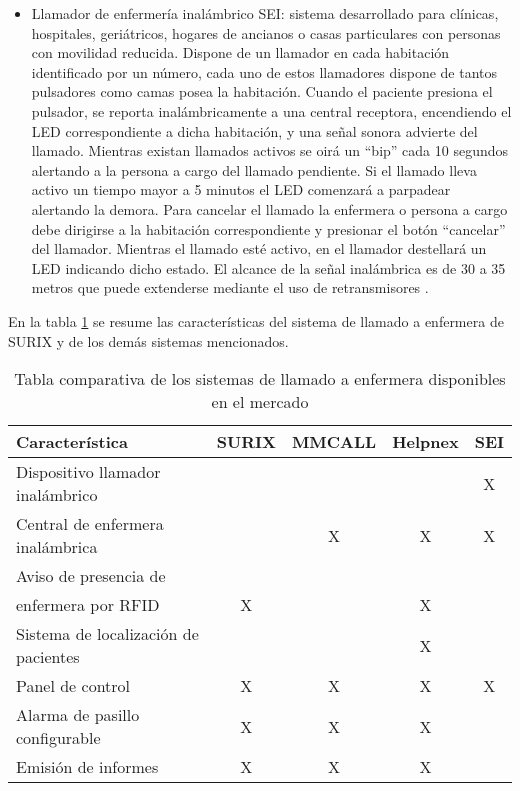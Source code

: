 \begin{itemize}
\item Llamador de enfermería inalámbrico SEI: sistema desarrollado para clínicas, hospitales, geriátricos, hogares de ancianos o casas particulares con personas con movilidad reducida. Dispone de un llamador en cada habitación identificado por un número, cada uno de estos llamadores dispone de tantos pulsadores como camas posea la habitación. Cuando el paciente presiona el pulsador, se reporta inalámbricamente a una central receptora, encendiendo el LED correspondiente a dicha habitación, y una señal sonora advierte del llamado. Mientras existan llamados activos se oirá un “bip” cada 10 segundos alertando a la persona a cargo del llamado pendiente. Si el llamado lleva activo un tiempo mayor a 5 minutos el LED comenzará a parpadear alertando la demora. Para cancelar el llamado la enfermera o persona a cargo debe dirigirse a la habitación correspondiente y presionar el botón “cancelar” del llamador. Mientras el llamado esté activo, en el llamador destellará un LED indicando dicho estado. El alcance de la señal inalámbrica es de 30 a 35 metros que puede extenderse mediante el uso de retransmisores \cite{sei}.

\end{itemize}

En la tabla \ref{tab:sistemasDeLLamadoEnfermera} se resume las características del sistema de llamado a enfermera de SURIX y de los demás sistemas mencionados.

\begin{table}[h]
	\centering
	\caption[Sistemas de llamado a enfermera]{Tabla comparativa de los sistemas de llamado a enfermera disponibles en el mercado}
	\begin{tabular}{l c c c c}    
		\toprule
		\textbf{Característica} 	 & \textbf{SURIX} & \textbf{MMCALL} & \textbf{Helpnex} & \textbf{SEI}\\
		\midrule
		Dispositivo llamador inalámbrico 				&  	&  	&  	& X \\
		Central de enfermera inalámbrica 				&  	& X & X & X \\
		Aviso de presencia de\\enfermera por RFID 		& X	&  	& X	&   \\
		Sistema de localización de pacientes 			&  	&  	& X	&   \\
		Panel de control 								& X	& X	& X	& X \\
		Alarma de pasillo configurable	 				& X	& X	& X	&   \\
		Emisión de informes				 				& X	& X	& X	&   \\
		\bottomrule
		\hline
	\end{tabular}
	\label{tab:sistemasDeLLamadoEnfermera}
\end{table}


